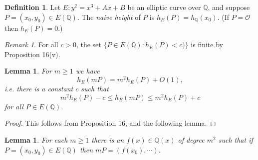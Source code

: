 \documentclass[a4paper]{article}
\theoremstyle{plain}
\newtheorem{lemma}[theorem]{Lemma}
\theoremstyle{remark}
\newtheorem*{remark}{Remark}
\theoremstyle{definition}
\newtheorem*{definition}{Definition}
\renewcommand{\O}{\mathcal{O}}
\newcommand{\Q}{\mathbb{Q}}
\begin{document}
\begin{definition}
    Let $E:y^2=x^3+Ax+B$ be an elliptic curve over $\Q$, and suppose
    $P=(x_0,y_0)\in E(\Q)$. The \emph{naive height} of $P$ is
    $h_E(P)=h_\Q(x_0)$. (If $P=\O$ then $h_E(P)=0$.)
\end{definition}

\begin{remark}
    For all $c>0$, the set $\{P\in E(\Q):h_E(P)<c)\}$ is finite by Proposition
    16(v).
\end{remark}

\begin{lemma}
    For $m\ge1$ we have
    \begin{equation*}
        h_E(mP) = m^2h_E(P) + O(1),
    \end{equation*}
    i.e. there is a constant $c$ such that
    \begin{equation*}
        m^2h_E(P) - c \le h_E(mP) \le m^2h_E(P) + c
    \end{equation*}
    for all $P\in E(\Q)$.
\end{lemma}

\begin{proof}
    This follows from Proposition 16, and the following lemma.
\end{proof}

\begin{lemma}
    For each $m\ge1$ there is an $f(x)\in\Q(x)$ of degree $m^2$ such that if
    $P=(x_0,y_0)\in E(\Q)$ then $mP=(f(x_0),\cdots)$.
\end{lemma}
\end{document}
